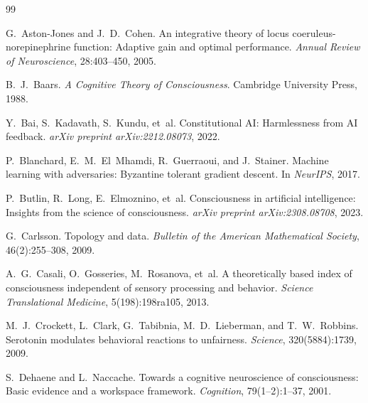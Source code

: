 \documentclass[12pt]{book}
\begin{document}
\backmatter

\begin{thebibliography}{99}

G.~Aston-Jones and J.~D.~Cohen.
\newblock An integrative theory of locus coeruleus-norepinephrine function: Adaptive gain and optimal performance.
\newblock \textit{Annual Review of Neuroscience}, 28:403--450, 2005.

B.~J.~Baars.
\newblock \textit{A Cognitive Theory of Consciousness}.
\newblock Cambridge University Press, 1988.

Y.~Bai, S.~Kadavath, S.~Kundu, et~al.
\newblock Constitutional AI: Harmlessness from AI feedback.
\newblock \textit{arXiv preprint arXiv:2212.08073}, 2022.

P.~Blanchard, E.~M.~El~Mhamdi, R.~Guerraoui, and J.~Stainer.
\newblock Machine learning with adversaries: Byzantine tolerant gradient descent.
\newblock In \textit{NeurIPS}, 2017.

P.~Butlin, R.~Long, E.~Elmoznino, et~al.
\newblock Consciousness in artificial intelligence: Insights from the science of consciousness.
\newblock \textit{arXiv preprint arXiv:2308.08708}, 2023.

G.~Carlsson.
\newblock Topology and data.
\newblock \textit{Bulletin of the American Mathematical Society}, 46(2):255--308, 2009.

A.~G.~Casali, O.~Gosseries, M.~Rosanova, et~al.
\newblock A theoretically based index of consciousness independent of sensory processing and behavior.
\newblock \textit{Science Translational Medicine}, 5(198):198ra105, 2013.

M.~J.~Crockett, L.~Clark, G.~Tabibnia, M.~D.~Lieberman, and T.~W.~Robbins.
\newblock Serotonin modulates behavioral reactions to unfairness.
\newblock \textit{Science}, 320(5884):1739, 2009.

S.~Dehaene and L.~Naccache.
\newblock Towards a cognitive neuroscience of consciousness: Basic evidence and a workspace framework.
\newblock \textit{Cognition}, 79(1--2):1--37, 2001.


\end{thebibliography}
\end{document}
